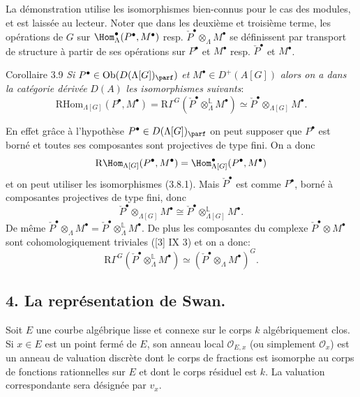 La démonstration utilise les isomorphismes bien-connus pour le cas des modules, et est laissée au lecteur. Noter que dans les deuxième et troisième terme, les opérations de $G$ sur $\Hom_\Lambda^\bullet(P^\bullet,M^\bullet)$ resp. $\check P^\bullet\otimes_\Lambda M^\bullet$ se définissent par transport de structure à partir de ses opérations sur $P^\bullet$ et $M^\bullet$ resp. $\check P^\bullet$ et $M^\bullet$.

\begin{statement}{Corollaire 3.9}
\emph{Si} $P^\bullet\in \operatorname{Ob}(D(\Lambda[G])_{\parf})$ \emph{et} $M^\bullet\in D^+(A[G])$ \emph{alors on a dans la catégorie dérivée} $D(A)$ \emph{les isomorphismes suivants}:
\[
\mathrm{RHom}_{\Lambda[G]}(P^\bullet,M^\bullet)
=\mathrm{R}\Gamma^G(\check P^\bullet\otimes_\Lambda^{\mathbb{L}}M^\bullet)
\simeq \check P^\bullet\otimes_{\Lambda[G]}M^\bullet.
\tag{3.9.1}
\]
\end{statement}

En effet grâce à l'hypothèse $P^\bullet\in D(\Lambda[G])_{\parf}$ on peut supposer que $P^\bullet$ est borné et toutes ses composantes sont projectives de type 
fini. On a donc
\[
\mathrm{R}\Hom_{\Lambda[G]}(P^\bullet,M^\bullet)=\Hom_{\Lambda[G]}^\bullet(P^\bullet,M^\bullet)
\]
et on
peut utiliser les isomorphismes (3.8.1). Mais $\check P^\bullet$ est comme $P^\bullet$, borné à composantes projectives de type fini, donc
\[
\check P^\bullet\otimes_{\Lambda[G]}M^\bullet\cong \check P^\bullet\otimes_{\Lambda[G]}^{\mathbb{L}}M^\bullet.
\]
De même $\check P^\bullet\otimes_\Lambda M^\bullet=\check P^\bullet\otimes_\Lambda^{\mathbb{L}}M^\bullet$. De plus les composantes du complexe $\check P^\bullet\otimes M^\bullet$ sont cohomologiquement triviales ([3] IX 3) et on a donc:
\[
\mathrm{R}\Gamma^G(\check P^\bullet\otimes_\Lambda^{\mathbb{L}}M^\bullet)\simeq (\check P^\bullet\otimes_\Lambda M^\bullet)^G.
\]

\subsection*{4. La représentation de Swan.}

Soit $E$ une courbe algébrique lisse et connexe sur le corps $k$ algébriquement clos. Si $x\in E$ est un point fermé de $E$, son anneau local $\mathcal{O}_{E,x}$ (ou simplement $\mathcal{O}_x$) est un anneau de valuation discrète dont le corps de fractions est isomorphe au corps de fonctions rationnelles sur $E$ et dont le corps résiduel est $k$. La valuation correspondante sera désignée par $v_x$.

